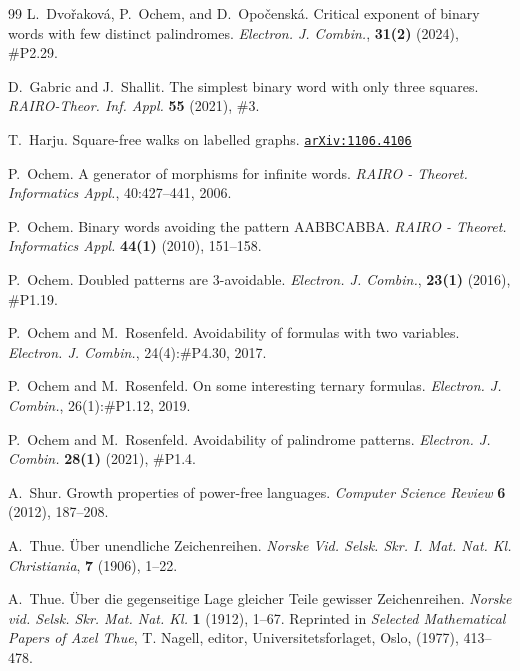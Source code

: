\documentclass{article}
\newcommand{\arxiv}[1]{\href{http://arxiv.org/abs/#1}{\texttt{arXiv:#1}}}
\theoremstyle{plain}
\theoremstyle{definition}
\theoremstyle{remark}
\begin{document}
\begin{thebibliography}{99}
 L.~Dvořaková, P.~Ochem, and D.~Opočenská.
Critical exponent of binary words with few distinct palindromes.
\emph{Electron. J. Combin.}, {\bf 31(2)} (2024), \#P2.29.

 D.~Gabric and J.~Shallit.
The simplest binary word with only three squares.
\emph{RAIRO-Theor. Inf. Appl.} {\bf 55} (2021), \#3.

 T.~Harju.
Square-free walks on labelled graphs.
\arxiv{1106.4106}

 P.~Ochem.
A generator of morphisms for infinite words.
\emph{RAIRO - Theoret. Informatics Appl.}, 40:427--441, 2006.

 P.~Ochem.
Binary words avoiding the pattern AABBCABBA.
\emph{RAIRO - Theoret. Informatics Appl.} {\bf 44(1)} (2010), 151--158.

 P.~Ochem.
Doubled patterns are 3-avoidable.
\emph{Electron. J. Combin.}, {\bf 23(1)} (2016), \#P1.19.

 P.~Ochem and M.~Rosenfeld.
Avoidability of formulas with two variables.
\emph{Electron. J. Combin.}, 24(4):\#P4.30, 2017.

 P.~Ochem and M.~Rosenfeld.
On some interesting ternary formulas.
\emph{Electron. J. Combin.}, 26(1):\#P1.12, 2019.

 P.~Ochem and M.~Rosenfeld.
Avoidability of palindrome patterns.
\emph{Electron. J. Combin.} {\bf 28(1)} (2021), \#P1.4.

 A.~Shur.
Growth properties of power-free languages.
\emph{Computer Science Review} {\bf 6} (2012), 187--208.

 A.~Thue.
\"{U}ber unendliche {Z}eichenreihen.
\emph{Norske Vid. Selsk. Skr. I. Mat. Nat. Kl. Christiania}, {\bf 7} (1906), 1--22.

 A.~Thue.
\"Uber die gegenseitige Lage gleicher Teile gewisser Zeichenreihen.
\emph{Norske vid. Selsk. Skr. Mat. Nat. Kl.} {\bf 1} (1912), 1--67.
Reprinted in \emph{Selected Mathematical Papers of Axel Thue}, T.
Nagell, editor, Universitetsforlaget, Oslo, (1977), 413--478.

\end{thebibliography}
\end{document}
